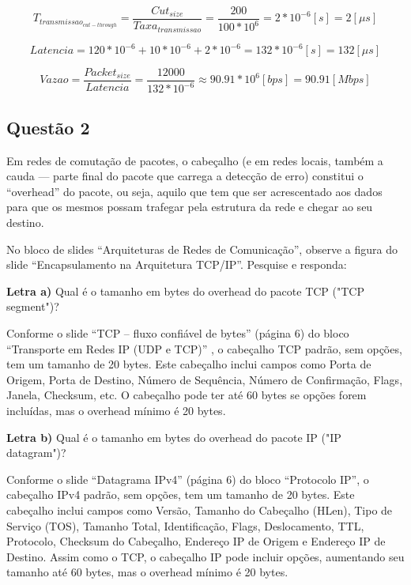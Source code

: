 \begin{equation}
	T_{transmissao_{cut-through}} = \frac{Cut_{size}}{Taxa_{transmissao}} = \frac{200}{100 * 10^6} =  2*10^{-6} [s] = 2 [\mu s]
\end{equation}

\begin{equation}
	Latencia = 120 * 10^{-6} + 10 * 10^{-6} + 2*10^{-6} = 132 * 10^{-6} [s] = 132 [\mu s]
\end{equation}

\begin{equation}
	Vazao = \frac{Packet_{size}}{Latencia} = \frac{12000}{132 * 10^{-6}} \approx 90.91 * 10^6 [bps] = 90.91 [Mbps]
\end{equation}

\subsection{Questão 2}

Em redes de comutação de pacotes, o cabeçalho (e em redes locais, também a cauda — parte final do pacote que carrega a detecção de erro) constitui o “overhead” do pacote, ou seja, aquilo que tem que ser acrescentado aos dados para que os mesmos possam trafegar pela estrutura da rede e chegar ao seu destino.

No bloco de slides “Arquiteturas de Redes de Comunicação”, observe a figura do slide “Encapsulamento na Arquitetura TCP/IP”. Pesquise e responda:
\newline

\textbf{Letra a)} Qual é o tamanho em bytes do overhead do pacote TCP ("TCP segment")? 
\newline

Conforme o slide “TCP – fluxo confiável de bytes” (página 6) do bloco “Transporte em Redes IP (UDP e TCP)” \autocite{peterson2025redes} , o cabeçalho TCP padrão, sem opções, tem um tamanho de 20 bytes. Este cabeçalho inclui campos como Porta de Origem, Porta de Destino, Número de Sequência, Número de Confirmação, Flags, Janela, Checksum, etc. O cabeçalho pode ter até 60 bytes se opções forem incluídas, mas o overhead mínimo é 20 bytes.
\newline

\textbf{Letra b)} Qual é o tamanho em bytes do overhead do pacote IP ("IP datagram")?
\newline

Conforme o slide “Datagrama IPv4” (página 6) do bloco “Protocolo IP”, o cabeçalho IPv4 padrão, sem opções, tem um tamanho de 20 bytes. Este cabeçalho inclui campos como Versão, Tamanho do Cabeçalho (HLen), Tipo de Serviço (TOS), Tamanho Total, Identificação, Flags, Deslocamento, TTL, Protocolo, Checksum do Cabeçalho, Endereço IP de Origem e Endereço IP de Destino. Assim como o TCP, o cabeçalho IP pode incluir opções, aumentando seu tamanho até 60 bytes, mas o overhead mínimo é 20 bytes.
\newline

